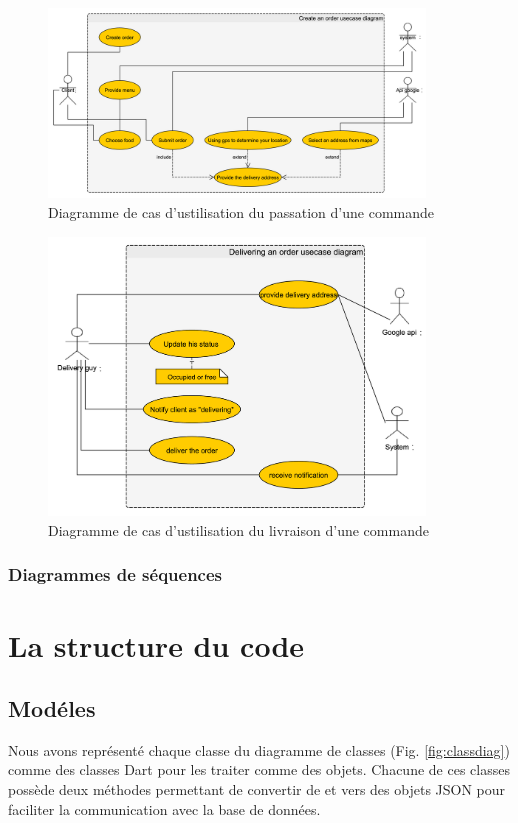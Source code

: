 \documentclass[french, a4paper, french]{report}
\begin{document}
			\newpage
			\begin{figure}[!h]
  				\center
  				\includegraphics[width=10cm]{usecaseorder.png}
  				\caption{Diagramme de cas d'ustilisation du passation d'une commande}
  				\label{fig:usecaseorder}
			\end{figure}
			
			\newpage
			\begin{figure}[!h]
  				\center
  				\includegraphics[width=10cm]{usecasedeliver.png}
  				\caption{Diagramme de cas d'ustilisation du livraison d'une commande}
  				\label{fig:usecasedeliver}
			\end{figure}
		\subsubsection{Diagrammes de séquences}
	\section{La structure du code}
		\subsection{Modéles} Nous avons représenté chaque classe du diagramme de classes (Fig. \ref{fig:classdiag}) comme des classes Dart pour les traiter comme des objets. Chacune de ces classes possède deux méthodes permettant de convertir de et vers des objets JSON  pour faciliter la communication avec la base de données.
\end{document}
